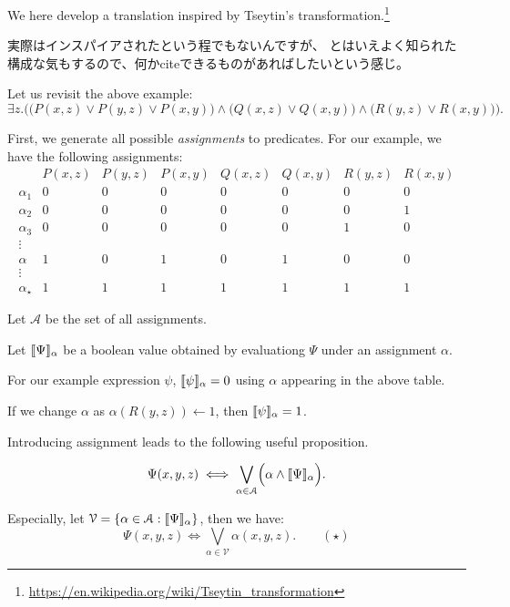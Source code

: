 We here develop a translation inspired by Tseytin's transformation.\footnote{\url{https://en.wikipedia.org/wiki/Tseytin_transformation}}

\begin{Jcomment}
    実際はインスパイアされたという程でもないんですが、
    とはいえよく知られた構成な気もするので、何かciteできるものがあればしたいという感じ。
\end{Jcomment}

Let us revisit the above example:
$$
\exists z. \biggl(
\bigl(P(x, z) \lor P(y, z) \lor P(x, y) \bigr)
\land
\bigl(Q(x, z) \lor Q(x, y)\bigr)
\land
\bigl(R(y, z) \lor R(x, y)\bigr)
\biggr).
$$

First, we generate all possible \emph{assignments} to predicates.
For our example, we have the following assignments:
$$
\begin{array}{c|ccccccc}
& P(x, z) & P(y, z) & P(x, y) & Q(x, z) & Q(x, y) & R(y, z) & R(x, y) \\\hline
\alpha_1 & 0 & 0 & 0 & 0 & 0 & 0 & 0 \\
\alpha_2 & 0 & 0 & 0 & 0 & 0 & 0 & 1 \\
\alpha_3 & 0 & 0 & 0 & 0 & 0 & 1 & 0 \\
\vdots \\
\alpha   & 1 & 0 & 1 & 0 & 1 & 0 & 0 \\
\vdots \\
\alpha_{\star}   & 1 & 1 & 1 & 1 & 1 & 1 & 1
\end{array}
$$

Let $\mathcal{A}$ be the set of all assignments.

Let $\llbracket\Psi\rrbracket_{\alpha}$ be a boolean value obtained by evaluationg $\Psi$ under an assignment $\alpha$.

For our example expression $\psi$, $\llbracket\psi\rrbracket_{\alpha} = 0$ using $\alpha$ appearing in the above table.

If we change $\alpha$ as $\alpha(R(y,z)) \gets 1$, then $\llbracket\psi\rrbracket_{\alpha} = 1$.

Introducing assignment leads to the following useful proposition.
\begin{proposition}
$$
\Psi(x, y, z) \iff
\bigvee_{\alpha \in \mathcal{A}} \Bigl( \alpha \land \llbracket\Psi\rrbracket_{\alpha} \Bigr).
$$

Especially, let $\mathcal{V} = \{ \alpha \in \mathcal{A} : \llbracket\Psi\rrbracket_\alpha \}$, then we have:
$$
\Psi(x,y, z) \iff \bigvee_{\alpha \in \mathcal{V}} \alpha(x, y, z). \qquad (\star)
$$
\end{proposition}


